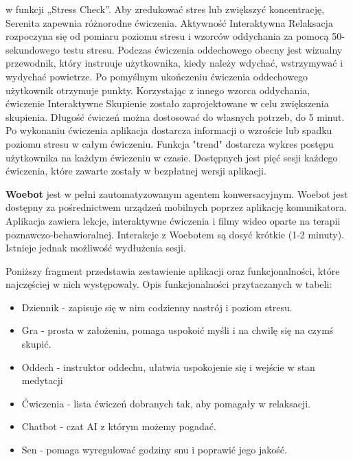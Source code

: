 w funkcji „Stress Check”. Aby zredukować stres lub zwiększyć koncentrację,
Serenita zapewnia różnorodne ćwiczenia. Aktywność Interaktywna Relaksacja
rozpoczyna się od pomiaru poziomu stresu i wzorców oddychania za pomocą
50-sekundowego testu stresu. Podczas ćwiczenia oddechowego obecny jest wizualny
przewodnik, który instruuje użytkownika, kiedy należy wdychać, wstrzymywać i
wydychać powietrze. Po pomyślnym ukończeniu ćwiczenia oddechowego użytkownik
otrzymuje punkty. Korzystając z innego wzorca oddychania, ćwiczenie Interaktywne
Skupienie zostało zaprojektowane w celu zwiększenia skupienia. Długość ćwiczeń
można dostosować do własnych potrzeb, do 5 minut. Po wykonaniu ćwiczenia
aplikacja dostarcza informacji o wzroście lub spadku poziomu stresu w całym
ćwiczeniu. Funkcja "trend" dostarcza wykres postępu użytkownika na każdym
ćwiczeniu w czasie. Dostępnych jest pięć sesji każdego ćwiczenia, które zawarte
zostały w bezpłatnej wersji aplikacji.

\textbf{Woebot} jest w pełni zautomatyzowanym agentem konwersacyjnym. Woebot
jest dostępny za pośrednictwem urządzeń mobilnych poprzez aplikację
komunikatora. Aplikacja zawiera lekcje, interaktywne ćwiczenia i filmy wideo
oparte na terapii poznawczo-behawioralnej. Interakcje z Woebotem są dosyć
krótkie (1-2 minuty). Istnieje jednak możliwość wydłużenia sesji.

Poniższy fragment przedstawia zestawienie aplikacji oraz funkcjonalności, które
najczęściej w nich występowały. Opis funkcjonalności przytaczanych w tabeli:
\begin{itemize}
    \item Dziennik - zapisuje się w nim codzienny nastrój i poziom stresu.
    \item Gra - prosta w założeniu, pomaga uspokoić myśli i na chwilę się na
          czymś skupić.
    \item Oddech - instruktor oddechu, ułatwia uspokojenie się i wejście w stan
          medytacji
    \item Ćwiczenia - lista ćwiczeń dobranych tak, aby pomagały w relaksacji.
    \item Chatbot - czat AI z którym możemy pogadać.
    \item Sen - pomaga wyregulować godziny snu i poprawić jego jakość.
\end{itemize}

